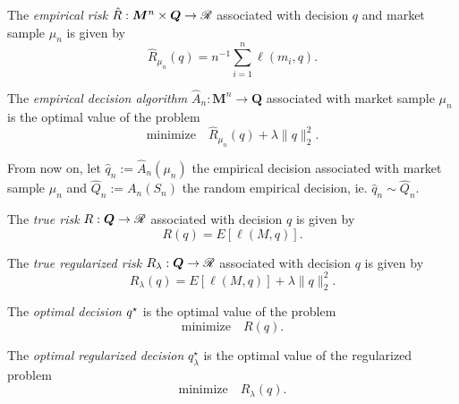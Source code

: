\documentclass[11pt]{article}
\begin{document}
\begin{deff}
  The \textsl{empirical risk} $\hat R: \bm M^n\times \bm Q \to \mathscr{R}$ associated with decision
  $q$ and market sample $\mu_n$ is given by
 \begin{equation*}
   \hat R_{\mu_n}(q) = n^{-1} \sum_{i=1}^n \ell(m_i,q).
 \end{equation*}
\end{deff}

\begin{deff}
  The \textsl{empirical decision algorithm} $\hat A_n:\bm M^n \to \bm Q$ associated with
  market sample $\mu_n$ is the optimal value of the problem
  \begin{equation*}
    \text{minimize}\quad\hat R_{\mu_n}(q) + \lambda\|q\|_2^2.
  \end{equation*}
\end{deff}

From now on, let $\hat q_n := \hat A_n(\mu_n)$ the empirical decision associated with
market sample $\mu_n$ and $\hat Q_n := A_n(S_n)$ the random empirical decision, ie.
$\hat q_n \sim \hat Q_n$.

\begin{deff}
  The \textsl{true risk} $R:\bm Q\to\mathscr{R}$ associated with decision $q$ is given by
  \begin{equation*}
    R(q) = E[\ell(M,q)].
  \end{equation*}
\end{deff}

\begin{deff}
  The \textsl{true regularized risk} $R_\lambda:\bm Q\to\mathscr{R}$ associated with decision $q$
  is given by 
  \begin{equation*}
    R_\lambda(q) = E[\ell(M,q)] + \lambda\|q\|^2_2.
  \end{equation*}
\end{deff}

\begin{deff}
  The \textsl{optimal decision} ${q^\star}$ is the optimal value of the problem
  \begin{equation*}
    \text{minimize}\quad R(q).
  \end{equation*}
\end{deff}

\begin{deff}
  The \textsl{optimal regularized decision} $q^\star_\lambda$ is the optimal value of the
  regularized problem 
  \begin{equation*}
        \text{minimize}\quad R_\lambda(q).
  \end{equation*}
\end{deff}
\end{document}
